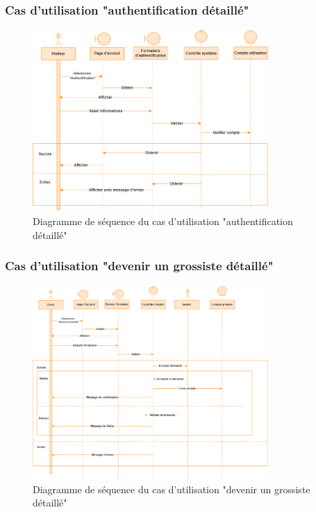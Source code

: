 \documentclass[edit,12pt,a4paper,ChapStyle,oneside,doubleinterligne]{report}
\begin{document}
\subsubsection{Cas d'utilisation "authentification détaillé"}
\begin{figure}[h!]\label{fig:Diagramme cas 1d}
\centering
\includegraphics[width=0.8\textwidth]{images/Authentification d.png}
\caption{Diagramme de séquence du cas d'utilisation "authentification détaillé"}
\end{figure}



\newpage
\subsubsection{Cas d'utilisation "devenir un grossiste détaillé"}
\begin{figure}[h!]\label{fig:Diagramme cas 2d}
\centering
\includegraphics[width=0.8\textwidth]{images/Devenir un grossiste d.png}
\caption{Diagramme de séquence du cas d'utilisation "devenir un grossiste détaillé"}
\end{figure}
\end{document}
